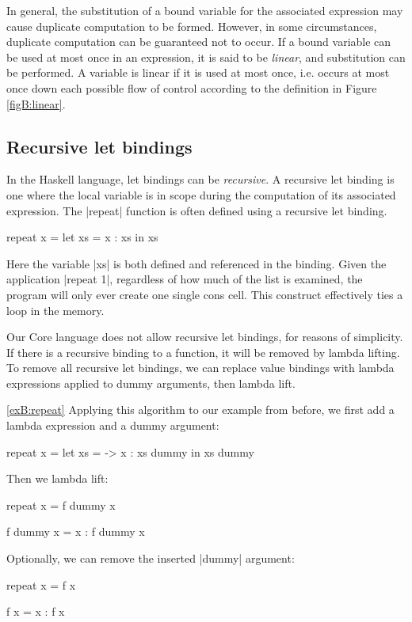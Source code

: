 In general, the substitution of a bound variable for the associated expression may cause duplicate computation to be formed. However, in some circumstances, duplicate computation can be guaranteed not to occur. If a bound variable can be used at most once in an expression, it is said to be \textit{linear}, and substitution can be performed. A variable is linear if it is used at most once, i.e. occurs at most once down each possible flow of control according to the definition in Figure \ref{figB:linear}.

\subsection{Recursive let bindings}

In the Haskell language, let bindings can be \textit{recursive}. A recursive let binding is one where the local variable is in scope during the computation of its associated expression. The |repeat| function is often defined using a recursive let binding.

\begin{example}
\label{exB:repeat}
\begin{code}
repeat x =  let xs = x : xs
            in xs
\end{code}

Here the variable |xs| is both defined and referenced in the binding. Given the application |repeat 1|, regardless of how much of the list is examined, the program will only ever create one single cons cell. This construct effectively ties a loop in the memory.
\end{example}

Our Core language does not allow recursive let bindings, for reasons of simplicity. If there is a recursive binding to a function, it will be removed by lambda lifting. To remove all recursive let bindings, we can replace value bindings with lambda expressions applied to dummy arguments, then lambda lift.

\begin{examplerevisit}{\ref{exB:repeat}}
Applying this algorithm to our example from before, we first add a lambda expression and a dummy argument:

\begin{code}
repeat x =  let xs = \dummy ->  x : xs dummy
            in xs dummy
\end{code}

Then we lambda lift:

\begin{onepage}
\begin{code}
repeat x = f dummy x

f dummy x = x : f dummy x
\end{code}
\end{onepage}

Optionally, we can remove the inserted |dummy| argument:

\begin{code}
repeat x = f x

f x = x : f x
\end{code}
\end{examplerevisit}

